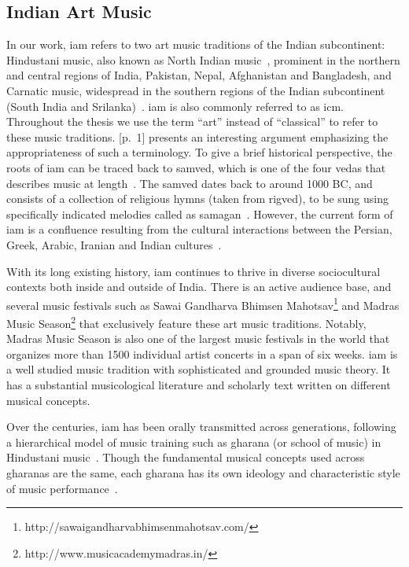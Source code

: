 \subsection{Indian Art Music}
\label{sec:music_background_iam}

In our work, \acrfull{iam} refers to two art music traditions of the Indian subcontinent: Hindustani music, also known as North Indian music~\citep{Bor2010, Danielou2010}, prominent in the northern and central regions of India, Pakistan, Nepal, Afghanistan and Bangladesh, and Carnatic music, widespread in the southern regions of the Indian subcontinent (South India and Srilanka)~\citep{Singh1995,Viswanathan2004}. \gls{iam} is also commonly referred to as \gls{icm}. Throughout the thesis we use the term ``art'' instead of ``classical'' to refer to these music traditions. \cite{Raja2012}[p.~1] presents an interesting argument emphasizing the appropriateness of such a terminology. To give a brief historical perspective, the roots of \gls{iam} can be traced back to \gls{samved}, which is one of the four \gls{vedas} that describes music at length~\citep{Trivedi2008,Singh1995}. The \gls{samved} dates back to around 1000 BC, and consists of a collection of religious hymns (taken from \gls{rigved}), to be sung using specifically indicated melodies called as \gls{samagan}~\citep{Griffith2004}. However, the current form of \gls{iam} is a confluence resulting from the cultural interactions between the Persian, Greek, Arabic, Iranian and Indian cultures~\citep{Kaul2007,Saraf2011,Singh1995}.

With its long existing history, \gls{iam} continues to thrive in diverse sociocultural contexts both inside and outside of India. There is an active audience base, and several music festivals such as Sawai Gandharva Bhimsen Mahotsav\footnote{http://sawaigandharvabhimsenmahotsav.com/} and Madras Music Season\footnote{http://www.musicacademymadras.in/} that exclusively feature these art music traditions. Notably, Madras Music Season is also one of the largest music festivals in the world that organizes more than 1500 individual artist concerts in a span of six weeks. \Gls{iam} is a well studied music tradition with sophisticated and grounded music theory. It has a substantial musicological literature and scholarly text written on different musical concepts. 

Over the centuries, \gls{iam} has been orally transmitted across generations, following a hierarchical model of music training such as \gls{gharana} (or school of music) in Hindustani music~\citep{Saraf2011,Mehta2008}. Though the fundamental musical concepts used across \glspl{gharana} are the same, each \gls{gharana} has its own ideology and characteristic style of music performance~\citep{Deshpande1989}. 

